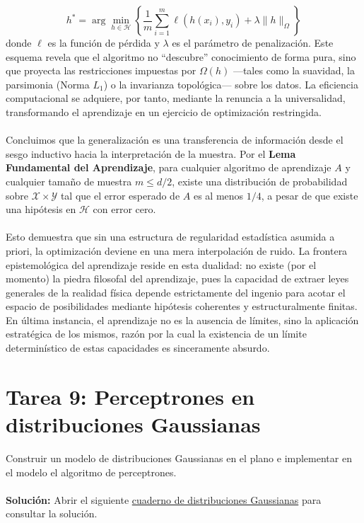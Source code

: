 \documentclass{article}
\begin{document}
\begin{equation}[H]
h^* = \arg \min_{h \in \mathcal{H}} \left\{ \frac{1}{m} \sum_{i=1}^m \ell(h(x_i), y_i) + \lambda \|h\|_{\Omega} \right\}
\end{equation}
\noindent donde $\ell$ es la función de pérdida y $\lambda$ es el parámetro de penalización. Este esquema revela que el algoritmo no ``descubre'' conocimiento de forma pura, sino que proyecta las restricciones impuestas por $\Omega(h)$ —tales como la suavidad, la parsimonia (Norma $L_1$) o la invarianza topológica— sobre los datos. La eficiencia computacional se adquiere, por tanto, mediante la renuncia a la universalidad, transformando el aprendizaje en un ejercicio de optimización restringida. \\ \\
Concluimos que la generalización es una transferencia de información desde el sesgo inductivo hacia la interpretación de la muestra. Por el \textbf{Lema Fundamental del Aprendizaje}, para cualquier algoritmo de aprendizaje $A$ y cualquier tamaño de muestra $m \leq d/2$, existe una distribución de probabilidad sobre $\mathcal{X} \times \mathcal{Y}$ tal que el error esperado de $A$ es al menos $1/4$, a pesar de que existe una hipótesis en $\mathcal{H}$ con error cero. \\ \\
Esto demuestra que sin una estructura de regularidad estadística asumida a priori, la optimización deviene en una mera interpolación de ruido. La frontera epistemológica del aprendizaje reside en esta dualidad: no existe (por el momento) la piedra filosofal del aprendizaje, pues la capacidad de extraer leyes generales de la realidad física depende estrictamente del ingenio para acotar el espacio de posibilidades mediante hipótesis coherentes y estructuralmente finitas. En última instancia, el aprendizaje no es la ausencia de límites, sino la aplicación estratégica de los mismos, razón por la cual la existencia de un límite determinístico de estas capacidades es sinceramente absurdo.
\section{Tarea 9: Perceptrones en distribuciones Gaussianas}
\noindent Construir un modelo de distribuciones Gaussianas en el plano e implementar en el modelo el algoritmo de perceptrones. \\ \\
\textbf{Solución:} Abrir el siguiente \href{https://colab.research.google.com/drive/1VsHPskZ8GEHAOjnnoC54lV5ICCNrOiIC?usp=sharing}{cuaderno de distribuciones Gaussianas} para consultar la solución.
\end{document}
